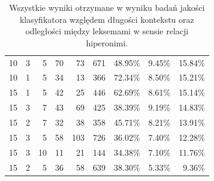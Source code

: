 \documentclass[a4paper,10pt]{report}
\begin{document}
\begin{table}[htp]
\begin{tabular}{rrrrrrrrr}
    10    & 3     & 5     & 70    & 73    & 671   & 48.95\% & 9.45\% & 15.84\% \\
    10    & 1     & 5     & 34    & 13    & 366   & 72.34\% & 8.50\% & 15.21\% \\
    15    & 1     & 5     & 42    & 25    & 446   & 62.69\% & 8.61\% & 15.14\% \\
    15    & 3     & 7     & 43    & 69    & 425   & 38.39\% & 9.19\% & 14.83\% \\
    15    & 2     & 7     & 32    & 38    & 358   & 45.71\% & 8.21\% & 13.91\% \\
    15    & 3     & 5     & 58    & 103   & 726   & 36.02\% & 7.40\% & 12.28\% \\
    15    & 3     & 10    & 11    & 21    & 144   & 34.38\% & 7.10\% & 11.76\% \\
    15    & 2     & 5     & 36    & 58    & 639   & 38.30\% & 5.33\% & 9.36\% \\
    \bottomrule
    \end{tabular}%
    \caption{Wszystkie wyniki otrzymane w wyniku badań jakości klasyfikatora względem długości kontekstu oraz odległości między leksemami w sensie relacji hiperonimi.}
  \label{tab:addlabel}%
\end{table}%
\end{document}

